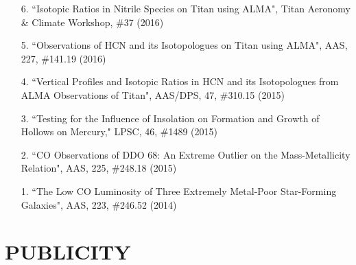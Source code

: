 \documentclass[margin, 10pt]{res} %
\begin{document}
\begin{resume}
\begin{enumerate}
\item[6.] ``Isotopic Ratios in Nitrile Species on Titan using ALMA", Titan Aeronomy \& Climate Workshop, \#37 (2016)
\item[5.] ``Observations of HCN and its Isotopologues on Titan using ALMA", AAS, 227, \#141.19 (2016)
\item[4.] ``Vertical Profiles and Isotopic Ratios in HCN and its Isotopologues from ALMA Observations of Titan", AAS/DPS, 47, \#310.15 (2015)
\item[3.] ``Testing for the Influence of Insolation on Formation and Growth of Hollows on Mercury," LPSC, 46, \#1489 (2015)
\item[2.] ``CO Observations of DDO 68: An Extreme Outlier on the Mass-Metallicity Relation", AAS, 225, \#248.18 (2015)
\item[1.] ``The Low CO Luminosity of Three Extremely Metal-Poor Star-Forming Galaxies", AAS, 223, \#246.52 (2014)

\end{enumerate}



%




\section{PUBLICITY}


\end{resume}
\end{document}
